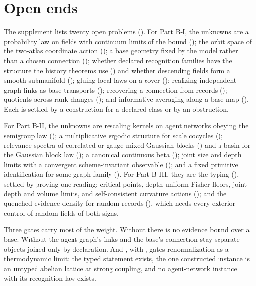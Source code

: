 \section{Open ends}
\label{comp:sb-open}

The supplement lists twenty open problems (). For Part B-I, the unknowns are a probability
law on fields with continuum limits of the bound (); the orbit space of the
two-atlas coordinate action (); a base geometry fixed by the model rather than a
chosen connection (); whether declared recognition families have the
structure the history theorems use () and whether descending fields form
a smooth submanifold (); gluing local laws on a cover
(); realizing independent graph links as base transports
(); recovering a connection from records
(); quotients across rank changes ();
and informative averaging along a base map (). Each is settled by a
construction for a declared class or by an obstruction.

For Part B-II, the unknowns are rescaling kernels on agent networks obeying the semigroup law
(); a multiplicative ergodic structure for scale cocycles
(); relevance spectra of correlated or gauge-mixed Gaussian blocks
() and a basin for the Gaussian block law
(); a canonical continuous beta (); joint
size and depth limits with a convergent scheme-invariant observable (); and a
fixed primitive identification for some graph family (). For Part B-III,
they are the typing (), settled by proving one reading; critical points,
depth-uniform Fisher floors, joint depth and volume limits, and self-consistent curvature actions
(); and the quenched evidence density for random records
(), which needs every-exterior control of random fields of both signs.

Three gates carry most of the weight. Without  there is no evidence bound over a
base. Without  the agent graph's links and the base's connection
stay separate objects joined only by declaration. And , with
, gates renormalization as a thermodynamic limit: the typed statement exists, the
one constructed instance is an untyped abelian lattice at strong coupling, and no agent-network instance with
its recognition law exists.

